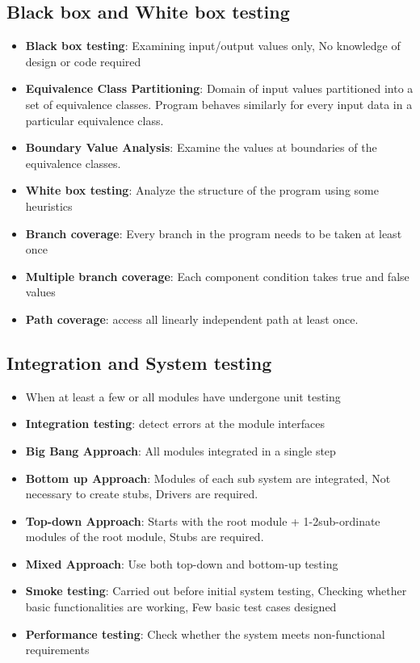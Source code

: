 \documentclass[a4paper]{article}
\begin{document}
\subsection{Black box and White box testing}
\begin{itemize}
    \item \textbf{Black box testing}: Examining input/output values only, No knowledge of design or code required
    \item \textbf{Equivalence Class Partitioning}: Domain of input values partitioned into a set of equivalence classes. Program behaves similarly for every input data in a particular equivalence class.
    \item \textbf{Boundary Value Analysis}: Examine the values at boundaries of the equivalence classes.
    \item \textbf{White box testing}: Analyze the structure of the program using some heuristics
    \item \textbf{Branch coverage}: Every branch in the program needs to be taken at least once
    \item \textbf{Multiple branch coverage}: Each component condition takes true and false values
    \item \textbf{Path coverage}: access all linearly independent path at least once.
\end{itemize}

\subsection{Integration and System testing}
\begin{itemize}
    \item When at least a few or all modules have undergone unit testing
    \item \textbf{Integration testing}: detect errors at the module interfaces
    \item \textbf{Big Bang Approach}: All modules integrated in a single step
    \item \textbf{Bottom up Approach}: Modules of each sub system are integrated, Not necessary to create stubs, Drivers are required.
    \item \textbf{Top-down Approach}: Starts with the root module + 1-2sub-ordinate modules of the root module, Stubs are required.
    \item \textbf{Mixed Approach}: Use both top-down and bottom-up testing
    \item \textbf{Smoke testing}: Carried out before initial system testing, Checking whether basic functionalities are working, Few basic test cases designed
    \item \textbf{Performance testing}: Check whether the system meets non-functional requirements
\end{itemize}
\end{document}

